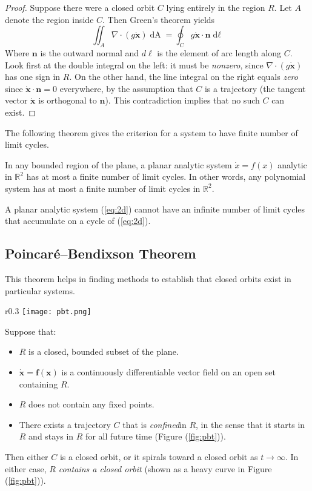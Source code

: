 \begin{proof}
	Suppose there were a closed orbit $C$ lying entirely in the region $R$. Let $A$ denote the region inside $C$. Then Green’s theorem yields
	\begin{equation}
		\iint_A\nabla\cdot(g\mathbf{\dot{x}})\mathop{dA}=\oint_Cg\mathbf{\dot{x}}\cdot\mathbf{n}\mathop{d\ell}
	\end{equation}
	Where $\mathbf{n}$ is the outward normal and $d\ell$ is the element of arc length along $C$.
	Look first at the double integral on the left: it must be \emph{nonzero}, since $\nabla\cdot(g\mathbf{\dot{x}})$ has one sign in $R$.
	On the other hand, the line integral on the right equals \emph{zero} since $\mathbf{\dot{x}}\cdot\mathbf{n}=0$ everywhere, by the assumption that $C$ is a trajectory (the tangent vector $\mathbf{\dot{x}}$ is orthogonal to $\mathbf{n}$).
	This contradiction implies that no such $C$ can exist.
\end{proof}
The following theorem gives the criterion for a system to have finite number of limit cycles.
\begin{theorem}
	In any bounded region of the plane, a planar analytic system $\dot{x}=f(x)$ analytic in $\mathbb{R}^2$ has at most a finite number of limit cycles.
	In other words, any polynomial system has at most a finite number of limit cycles in $\mathbb{R}^2$.
\end{theorem}
\begin{theorem}
	A planar analytic system (\ref{eq:2d}) cannot have an infinite number of limit cycles that accumulate on a cycle of (\ref{eq:2d}).
\end{theorem}
\subsection{Poincar\'e--Bendixson Theorem}
This theorem helps in finding methods to establish that closed orbits exist in particular systems.
\begin{wrapfigure}{r}{0.3\textwidth}
	\centering
	\texttt{[image: pbt.png]}
	\caption{}
	\label{fig:pbt}
\end{wrapfigure}
\begin{theorem}
	Suppose that:
	\begin{itemize}
		\item $R$ is a closed, bounded subset of the plane.
		\item $\mathbf{\dot{x}=f(x)}$ is a continuously differentiable vector field on an open set containing $R$.
		\item $R$ does not contain any fixed points.
		\item There exists a trajectory $C$ that is \emph{confined}in $R$, in the sense that it starts in $R$ and stays in $R$ for all future time (Figure (\ref{fig:pbt})).
	\end{itemize}
	Then either $C$ is a closed orbit, or it spirals toward a closed orbit as $t\rightarrow\infty$.
	In either case, \emph{$R$ contains a closed orbit} (shown as a heavy curve in Figure (\ref{fig:pbt})). 
\end{theorem}